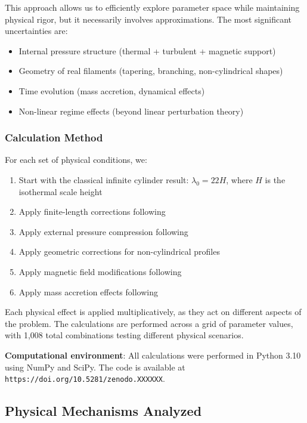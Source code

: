 \documentclass[11pt,a4paper]{article}
\begin{document}
This approach allows us to efficiently explore parameter space while maintaining physical rigor, but it necessarily involves approximations. The most significant uncertainties are:
\begin{itemize}
    \item Internal pressure structure (thermal + turbulent + magnetic support)
    \item Geometry of real filaments (tapering, branching, non-cylindrical shapes)
    \item Time evolution (mass accretion, dynamical effects)
    \item Non-linear regime effects (beyond linear perturbation theory)
\end{itemize}

\subsubsection{Calculation Method}
For each set of physical conditions, we:
\begin{enumerate}
    \item Start with the classical infinite cylinder result: $\lambda_0 = 22H$, where $H$ is the isothermal scale height
    \item Apply finite-length corrections following \citet{Inutsuka1997}
    \item Apply external pressure compression following \citet{Fischera2012}
    \item Apply geometric corrections for non-cylindrical profiles
    \item Apply magnetic field modifications following \citet{Hennebelle2013}
    \item Apply mass accretion effects following \citet{Heitsch2013}
\end{enumerate}

Each physical effect is applied multiplicatively, as they act on different aspects of the problem. The calculations are performed across a grid of parameter values, with 1,008 total combinations testing different physical scenarios.

\textbf{Computational environment}: All calculations were performed in Python 3.10 using NumPy and SciPy. The code is available at \texttt{https://doi.org/10.5281/zenodo.XXXXXX}.

\subsection{Physical Mechanisms Analyzed}
\end{document}
